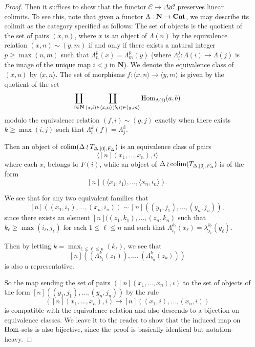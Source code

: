 \begin{proof}
Then it suffices to show that the functor \(\mathcal{C}\mapsto \Delta\wr \mathcal{C}\) preserves linear colimits.   To see this, note that given a functor \(\Lambda:\mathbf{N}\to \operatorname{\mathbf{Cat}}\), we may describe its colimit as the category specified as follows: The set of objects is the quotient of the set of pairs \((x,n)\), where \(x\) is an object of \(\Lambda(n)\) by the equivalence relation \((x,n)\sim(y,m)\) if and only if there exists a natural integer \(p\geq \operatorname{max}(n,m)\) such that \(\Lambda_n^p(x)=\Lambda_m^p(y)\) (where \(\Lambda_i^j:\Lambda(i)\to \Lambda(j)\) is the image of the unique map \(i<j\) in \(\mathbf{N}\)).  We denote the equivalence class of \((x,n)\) by \(\langle x,n\rangle\).  The set of morphisms \(f:\langle x,n\rangle\to \langle y,m\rangle\) is given by the quotient of the set \[\coprod_{i\in \mathbf{N}}\coprod_{(a,i)\in \langle x,n\rangle\\ (b,i)\in \langle y,m\rangle}{\operatorname{Hom}}_{\Lambda(i)}(a,b)\] modulo the equivalence relation \((f,i)\sim (g,j)\) exactly when there exists \(k\geq\operatorname{max}(i,j)\) such that \(\Lambda_i^k(f)=\Lambda_j^k\).  

Then an object of \(\operatorname{colim}(\Delta\wr T_{\Delta,[0],F_\Delta})\) is an equivalence class of pairs \[\langle [n](x_1,\dots,x_n),i\rangle \] where each \(x_i\) belongs to \(F(i)\), while an object of \(\Delta\wr\operatorname{colim}(T_{\Delta,[0],F_\Delta})\) is of the form \[[n](\langle x_1,i_1 \rangle,\dots,\langle x_n,i_n \rangle).\] 

We see that for any two equivalent families that \[[n]((x_1,i_1),\dots,(x_n,i_n))\sim [n]((y_1,j_1),\dots,(y_n,j_n)),\] since there exists an element \([n]((z_1,k_1),\dots,(z_n,k_n)\) such that \(k_\ell\geq \operatorname{max}(i_\ell,j_\ell)\) for each \(1\leq \ell\leq n\) and such that \(\Lambda_{i_\ell}^{k_\ell}(x_\ell)=\lambda_{j_\ell}^{k_\ell}(y_\ell)\).  

Then by letting \(k=\operatorname{max}_{1\leq \ell\leq n}(k_\ell)\), we see that \[[n]((\Lambda_{k_1}^k(z_1)),\dots,(\Lambda_{k_n}^k(z_k)))\] is also a representative.  

So the map sending the set of pairs \(([n](x_1,\dots,x_n),i)\) to  the set of objects of the form \([n]((y_1,j_1),\dots,(y_n,j_n))\) by the rule \[([n](x_1,\dots,x_n),i)\mapsto [n]((x_1,i),\dots,(x_n,i))\] is compatible with the equivalence relation and also descends to a bijection on equivalence classes.  We leave it to the reader to show that the induced map on \({\operatorname{Hom}}\)-sets is also bijective, since the proof is basically identical but notation-heavy.
\end{proof}



